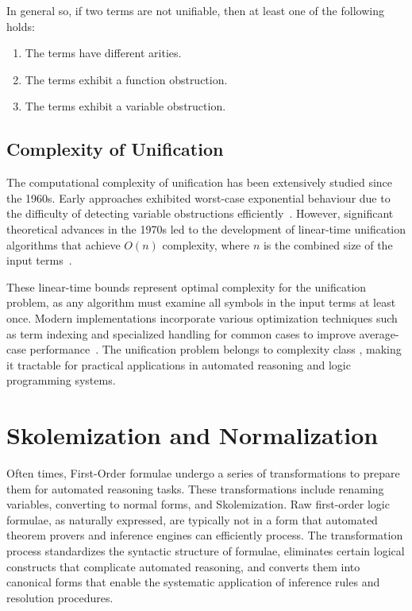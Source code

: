In general so, if two terms are not unifiable, then at least one of the following holds:
\begin{enumerate}
    \item The terms have different arities.
    \item The terms exhibit a function obstruction.
    \item The terms exhibit a variable obstruction.
\end{enumerate}


\subsection{Complexity of Unification}\label{subsec:complexity-of-unification}
The computational complexity of unification has been extensively studied since the 1960s.
Early approaches exhibited worst-case exponential behaviour due to the difficulty of detecting variable obstructions efficiently~\cite{robinson1965}.
However, significant theoretical advances in the 1970s led to the development of linear-time unification algorithms that achieve \(O(n)\) complexity, where \(n\) is the combined size of the input terms~\cite{martelli1976, paterson1978}.

These linear-time bounds represent optimal complexity for the unification problem, as any algorithm must examine all symbols in the input terms at least once.
Modern implementations incorporate various optimization techniques such as term indexing and specialized handling for common cases to improve average-case performance~\cite{martelli1976}.
The unification problem belongs to complexity class , making it tractable for practical applications in automated reasoning and logic programming systems.


\section{Skolemization and Normalization}\label{sec:skolemization_and_normalization}

Often times, First-Order formulae undergo a series of transformations to prepare them for automated reasoning tasks.
These transformations include renaming variables, converting to normal forms, and Skolemization.
Raw first-order logic formulae, as naturally expressed, are typically not in a form that automated theorem provers and inference engines can efficiently process.
The transformation process standardizes the syntactic structure of formulae, eliminates certain logical constructs that complicate automated reasoning, and converts them into canonical forms that enable the systematic application of inference rules and resolution procedures.

